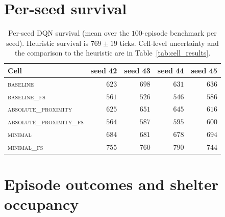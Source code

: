 \documentclass[12pt,a4paper,titlepage]{article}
\begin{document}
\section{Per-seed survival}
\label{app:per_seed}

\begin{table}[!ht]
\centering
\caption{Per-seed DQN survival (mean over the $100$-episode benchmark per seed). Heuristic survival is $769 \pm 19$ ticks. Cell-level uncertainty and the comparison to the heuristic are in Table~\ref{tab:cell_results}.}
\label{tab:per_seed}
\footnotesize
\begin{tabular}{lrrrr}
\toprule
Cell                              & seed 42 & seed 43 & seed 44 & seed 45 \\
\midrule
\textsc{baseline}                 & $623$ & $698$ & $631$ & $636$ \\
\textsc{baseline\_fs}             & $561$ & $526$ & $546$ & $586$ \\
\textsc{absolute\_proximity}      & $625$ & $651$ & $645$ & $616$ \\
\textsc{absolute\_proximity\_fs}  & $564$ & $587$ & $595$ & $600$ \\
\textsc{minimal}                  & $684$ & $681$ & $678$ & $694$ \\
\textsc{minimal\_fs}              & $755$ & $760$ & $790$ & $744$ \\
\bottomrule
\end{tabular}
\end{table}

\section{Episode outcomes and shelter occupancy}
\label{app:failure_modes}
\end{document}
